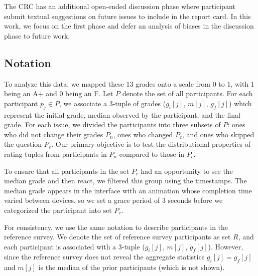 The CRC has an additional open-ended discussion phase where participant submit textual suggestions on future issues to include in the report card.
In this work, we focus on the first phase and defer an analysis of biases in the discussion phase to future work.

\subsection{Notation}
To analyze this data, we mapped these 13 grades onto a scale from 0 to 1, with 1 being an A+ and 0 being an F.
Let $P$ denote the set of all participants.
For each participant $p_j\in P$, we associate a 3-tuple of grades ($g_i[j]$, $m[j]$, $g_f[j]$) which represent the initial grade, median observed by the participant, and the final grade.
For each issue, we divided the participants into three subsets of $P$: ones who did not change their grades $P_n$, ones who changed $P_c$, and ones who skipped the question $P_s$.
Our primary objective is to test the distributional properties of rating tuples from participants in $P_n$ compared to those in $P_c$.

To ensure that all participants in the set $P_c$ had an opportunity to see the median grade and then react, we filtered this group using the timestamps. 
The median grade appears in the interface with an animation whose completion time varied between devices, so we set a grace period of 3 seconds before 
we categorized the participant into set $P_c$.  

For consistency, we use the same notation to describe participants in the reference survey. We denote the set of reference survey participants as set $R$, and each participant is associated with a 3-tuple ($g_i[j]$, $m[j]$, $g_f[j]$). However, since the reference survey does not reveal the aggregate statistics $g_i[j] = g_f[j]$  and $m[j]$ is the median of the prior participants (which is not shown).
